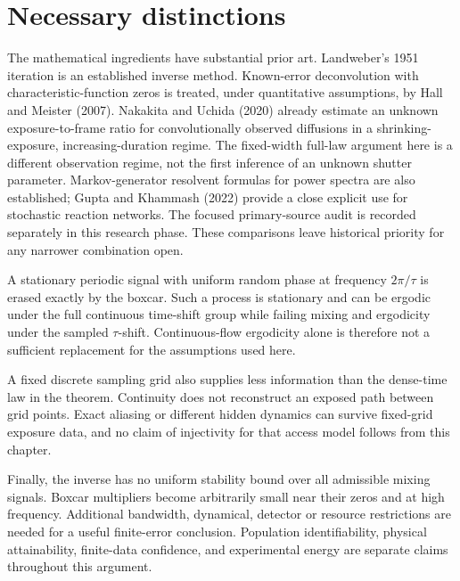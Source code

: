 \section{Necessary distinctions}

The mathematical ingredients have substantial prior art. Landweber's 1951
iteration is an established inverse method. Known-error deconvolution with
characteristic-function zeros is treated, under quantitative assumptions,
by Hall and Meister (2007). Nakakita and Uchida (2020) already estimate an
unknown exposure-to-frame ratio for convolutionally observed diffusions in
a shrinking-exposure, increasing-duration regime. The fixed-width
full-law argument here is a different observation regime, not the first
inference of an unknown shutter parameter. Markov-generator resolvent
formulas for power spectra are also established; Gupta and Khammash (2022)
provide a close explicit use for stochastic reaction networks. The focused
primary-source audit is recorded separately in this research phase. These
comparisons leave historical priority for any narrower combination open.

A stationary periodic signal with uniform random phase at frequency
$2\pi/\tau$ is erased exactly by the boxcar. Such a process is stationary
and can be ergodic under the full continuous time-shift group while failing
mixing and ergodicity under the sampled $\tau$-shift. Continuous-flow
ergodicity alone is therefore not a sufficient replacement for the
assumptions used here.

A fixed discrete sampling grid also supplies less information than the
dense-time law in the theorem. Continuity does not reconstruct an exposed
path between grid points. Exact aliasing or different hidden dynamics can
survive fixed-grid exposure data, and no claim of injectivity for that
access model follows from this chapter.

Finally, the inverse has no uniform stability bound over all admissible
mixing signals. Boxcar multipliers become arbitrarily small near their
zeros and at high frequency. Additional bandwidth, dynamical, detector or
resource restrictions are needed for a useful finite-error conclusion.
Population identifiability, physical attainability, finite-data confidence,
and experimental energy are separate claims throughout this argument.
